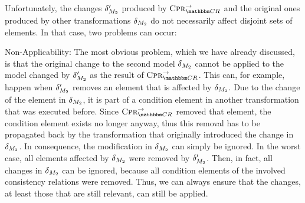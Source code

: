 Unfortunately, the changes $\change{\metamodel{M}{2}}'$ produced by $\consistencypreservationrule{\consistencyrelationset{CR}}^{\rightarrow}$ and the original ones produced by other transformations $\change{\metamodel{M}{2}}$ do not necessarily affect disjoint sets of elements.
In that case, two problems can occur:
\begin{properdescription}
    \item[Non-Applicability:] The most obvious problem, which we have already discussed, is that the original change to the second model $\change{\metamodel{M}{2}}$ cannot be applied to the model changed by $\change{\metamodel{M}{2}}'$ as the result of $\consistencypreservationrule{\consistencyrelationset{CR}}^{\rightarrow}$. 
    This can, for example, happen when $\change{\metamodel{M}{2}}'$ removes an element that is affected by $\change{\metamodel{M}{2}}$.
    Due to the change of the element in $\change{\metamodel{M}{2}}$, it is part of a condition element in another transformation that was executed before.
    Since $\consistencypreservationrule{\consistencyrelationset{CR}}^{\rightarrow}$ removed that element, the condition element exists no longer anyway, thus this removal has to be propagated back by the transformation that originally introduced the change in $\change{\metamodel{M}{2}}$.
    In consequence, the modification in $\change{\metamodel{M}{2}}$ can simply be ignored.
    In the worst case, all elements affected by $\change{\metamodel{M}{2}}$ were removed by $\change{\metamodel{M}{2}}'$.
    Then, in fact, all changes in $\change{\metamodel{M}{2}}$ can be ignored, because all condition elements of the involved consistency relations were removed.
    Thus, we can always ensure that the changes, at least those that are still relevant, can still be applied.
    

\end{properdescription}
